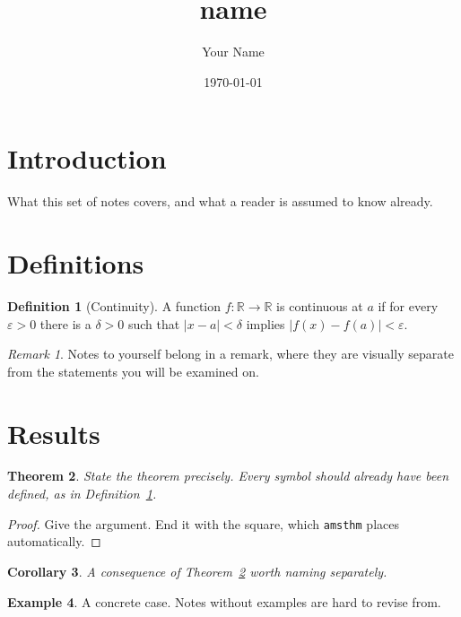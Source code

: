 \documentclass[11pt,a4paper]{article}
\title{{name}}
\author{Your Name}
\date{\today}
\theoremstyle{plain}
\newtheorem{theorem}{Theorem}[section]
\newtheorem{corollary}[theorem]{Corollary}
\theoremstyle{definition}
\newtheorem{definition}[theorem]{Definition}
\newtheorem{example}[theorem]{Example}
\theoremstyle{remark}
\newtheorem*{remark}{Remark}
\begin{document}
\maketitle

\tableofcontents

\section{Introduction}

What this set of notes covers, and what a reader is assumed to know
already.

\section{Definitions}

\begin{definition}[Continuity]
    \label{def:continuity}
    A function $f : \mathbb{R} \to \mathbb{R}$ is continuous at $a$ if
    for every $\varepsilon > 0$ there is a $\delta > 0$ such that
    $|x - a| < \delta$ implies $|f(x) - f(a)| < \varepsilon$.
\end{definition}

\begin{remark}
    Notes to yourself belong in a remark, where they are visually
    separate from the statements you will be examined on.
\end{remark}

\section{Results}

\begin{theorem}
    \label{thm:example}
    State the theorem precisely. Every symbol should already have been
    defined, as in Definition~\ref{def:continuity}.
\end{theorem}

\begin{proof}
    Give the argument. End it with the square, which \texttt{amsthm}
    places automatically. \qedhere
\end{proof}

\begin{corollary}
    A consequence of Theorem~\ref{thm:example} worth naming separately.
\end{corollary}

\begin{example}
    A concrete case. Notes without examples are hard to revise from.
\end{example}
\end{document}
